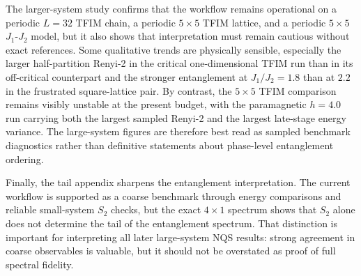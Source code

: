 \documentclass[11pt,a4paper]{article}
\begin{document}
The larger-system study confirms that the workflow remains operational on a periodic $L=32$ TFIM chain, a periodic $5\times 5$ TFIM lattice, and a periodic $5\times 5$ $J_1$-$J_2$ model, but it also shows that interpretation must remain cautious without exact references. Some qualitative trends are physically sensible, especially the larger half-partition Renyi-2 in the critical one-dimensional TFIM run than in its off-critical counterpart and the stronger entanglement at $J_1/J_2=1.8$ than at $2.2$ in the frustrated square-lattice pair. By contrast, the $5\times 5$ TFIM comparison remains visibly unstable at the present budget, with the paramagnetic $h=4.0$ run carrying both the largest sampled Renyi-2 and the largest late-stage energy variance. The large-system figures are therefore best read as sampled benchmark diagnostics rather than definitive statements about phase-level entanglement ordering.

Finally, the tail appendix sharpens the entanglement interpretation. The current workflow is supported as a coarse benchmark through energy comparisons and reliable small-system $S_2$ checks, but the exact $4\times 1$ spectrum shows that $S_2$ alone does not determine the tail of the entanglement spectrum. That distinction is important for interpreting all later large-system NQS results: strong agreement in coarse observables is valuable, but it should not be overstated as proof of full spectral fidelity.
\end{document}
